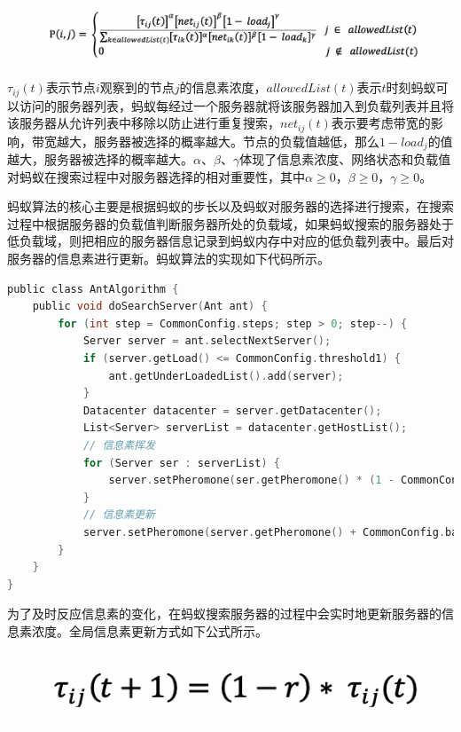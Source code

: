 \begin{figure}[htb]
  \centering
  \includegraphics[width=0.85\linewidth]{./Figure/IMG_Chap3_5.png}
\end{figure}

$ \tau_{ij} (t) $表示节点$ i $观察到的节点$ j $的信息素浓度，$allowedList(t) $表示$ t $时刻蚂蚁可以访问的服务器列表，蚂蚁每经过一个服务器就将该服务器加入到负载列表并且将该服务器从允许列表中移除以防止进行重复搜索，$net_{ij} (t) $表示要考虑带宽的影响，带宽越大，服务器被选择的概率越大。节点的负载值越低，那么$ 1 - load_j $的值越大，服务器被选择的概率越大。$ \alpha $、$ \beta $、$ \gamma $体现了信息素浓度、网络状态和负载值对蚂蚁在搜索过程中对服务器选择的相对重要性，其中$ \alpha ≥ 0 $，$ \beta ≥ 0 $，$ \gamma ≥ 0 $。

蚂蚁算法的核心主要是根据蚂蚁的步长以及蚂蚁对服务器的选择进行搜索，在搜索过程中根据服务器的负载值判断服务器所处的负载域，如果蚂蚁搜索的服务器处于低负载域，则把相应的服务器信息记录到蚂蚁内存中对应的低负载列表中。最后对服务器的信息素进行更新。蚂蚁算法的实现如下代码所示。

\begin{lstlisting}[language=C,caption={蚂蚁算法},label=Code:java]
public class AntAlgorithm {
    public void doSearchServer(Ant ant) {
        for (int step = CommonConfig.steps; step > 0; step--) {
            Server server = ant.selectNextServer();
            if (server.getLoad() <= CommonConfig.threshold1) {
                ant.getUnderLoadedList().add(server);
            }
            Datacenter datacenter = server.getDatacenter();
            List<Server> serverList = datacenter.getHostList();
            // 信息素挥发
            for (Server ser : serverList) {
                server.setPheromone(ser.getPheromone() * (1 - CommonConfig.rate));
            }
            // 信息素更新
            server.setPheromone(server.getPheromone() + CommonConfig.base * (1 - server.getLoad()));
        }
    }
}
\end{lstlisting}

为了及时反应信息素的变化，在蚂蚁搜索服务器的过程中会实时地更新服务器的信息素浓度。全局信息素更新方式如下公式所示。

\begin{figure}[htb]
  \centering
  \includegraphics[width=0.3\linewidth]{./Figure/IMG_Chap3_6.png}
\end{figure}

